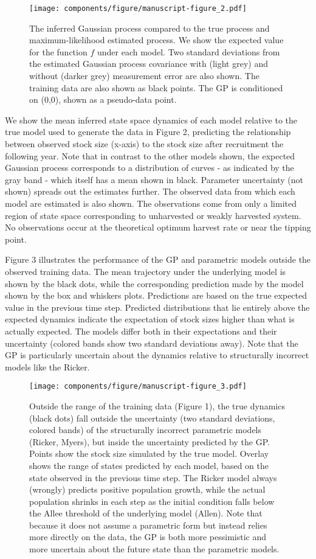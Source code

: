 \documentclass[author-year, 12pt,review]{components/elsarticle} %
\makeatletter
\def\maxwidth{\ifdim\Gin@nat@width>\linewidth\linewidth
\else\Gin@nat@width\fi}
\let\Oldincludegraphics\includegraphics
\renewcommand{\includegraphics}[1]{\Oldincludegraphics[width=\maxwidth]{#1}}
\makeatother
\begin{document}
\begin{figure}[htbp]
\centering
\texttt{[image: components/figure/manuscript-figure\_2.pdf]}
\caption{The inferred Gaussian process compared to the true process and
maximum-likelihood estimated process. We show the expected value for the
function $f$ under each model. Two standard deviations from the
estimated Gaussian process covariance with (light grey) and without
(darker grey) measurement error are also shown. The training data are
also shown as black points. The GP is conditioned on (0,0), shown as a
pseudo-data point.}
\end{figure}

We show the mean inferred state space dynamics of each model relative to
the true model used to generate the data in Figure 2, predicting the
relationship between observed stock size (x-axis) to the stock size
after recruitment the following year. Note that in contrast to the other
models shown, the expected Gaussian process corresponds to a
distribution of curves - as indicated by the gray band - which itself
has a mean shown in black. Parameter uncertainty (not shown) spreads out
the estimates further. The observed data from which each model are
estimated is also shown. The observations come from only a limited
region of state space corresponding to unharvested or weakly harvested
system. No observations occur at the theoretical optimum harvest rate or
near the tipping point.

Figure 3 illustrates the performance of the GP and parametric models
outside the observed training data. The mean trajectory under the
underlying model is shown by the black dots, while the corresponding
prediction made by the model shown by the box and whiskers plots.
Predictions are based on the true expected value in the previous time
step. Predicted distributions that lie entirely above the expected
dynamics indicate the expectation of stock sizes higher than what is
actually expected. The models differ both in their expectations and
their uncertainty (colored bands show two standard deviations away).
Note that the GP is particularly uncertain about the dynamics relative
to structurally incorrect models like the Ricker.

\begin{figure}[htbp]
\centering
\texttt{[image: components/figure/manuscript-figure\_3.pdf]}
\caption{Outside the range of the training data (Figure 1), the true
dynamics (black dots) fall outside the uncertainty (two standard
deviations, colored bands) of the structurally incorrect parametric
models (Ricker, Myers), but inside the uncertainty predicted by the GP.
Points show the stock size simulated by the true model. Overlay shows
the range of states predicted by each model, based on the state observed
in the previous time step. The Ricker model always (wrongly) predicts
positive population growth, while the actual population shrinks in each
step as the initial condition falls below the Allee threshold of the
underlying model (Allen). Note that because it does not assume a
parametric form but instead relies more directly on the data, the GP is
both more pessimistic and more uncertain about the future state than the
parametric models.}
\end{figure}
\end{document}
